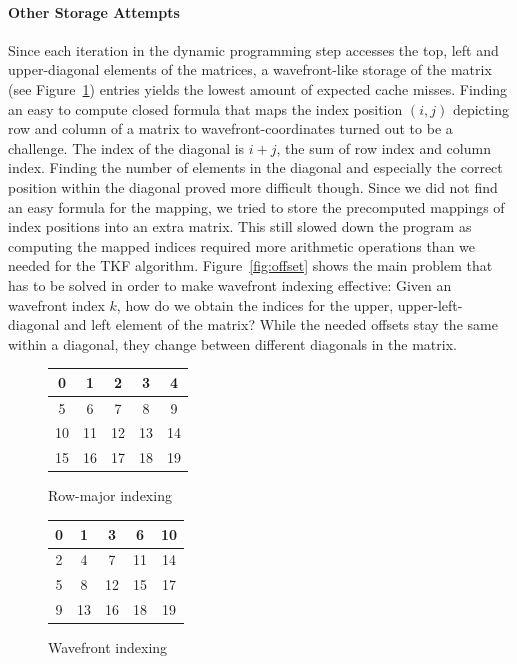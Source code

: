 \documentclass{article}
\begin{document}
\newpage

\paragraph{Other Storage Attempts}
\label{par:otherattempts}
Since each iteration in the dynamic programming step accesses the top, left and upper-diagonal elements of the matrices, a wavefront-like storage of the matrix (see Figure~\ref{fig:wavefront}) entries yields the lowest amount of expected cache misses. Finding an easy to compute closed formula that maps the index position $(i,j)$ depicting row and column of a matrix to wavefront-coordinates turned out to be a challenge. The index of the diagonal is $i+j$, the sum of row index and column index. Finding the number of elements in the diagonal and especially the correct position within the diagonal proved more difficult though.
Since we did not find an easy formula for the mapping, we tried to store the precomputed mappings of index positions into an extra matrix. This still slowed down the program as computing the mapped indices required more arithmetic operations than we needed for the TKF algorithm.
Figure~\ref{fig:offset} shows the main problem that has to be solved in order to make wavefront indexing effective: Given an wavefront index $k$, how do we obtain the indices for the upper, upper-left-diagonal and left element of the matrix? While the needed offsets stay the same within a diagonal, they change between different diagonals in the matrix.

\begin{figure}

\begin{minipage}{0.5\textwidth}
\centering
\begin{tabular}{|c|c|c|c|c|}
\hline 
0 & 1 & 2 & 3 & 4 \\ 
\hline 
5 & 6 & 7 & 8 & 9 \\ 
\hline 
10 & 11 & 12 & 13 & 14 \\ 
\hline 
15 & 16 & 17 & 18 & 19 \\ 
\hline
\end{tabular}
\caption{Row-major indexing}
\label{fig:rowmajor}
\end{minipage}
\begin{minipage}{0.5\textwidth}
\centering
\begin{tabular}{|c|c|c|c|c|}
\hline 
0 & 1 & 3 & 6 & 10 \\ 
\hline 
2 & 4 & 7 & 11 & 14 \\ 
\hline 
5 & 8 & 12 & 15 & 17 \\ 
\hline 
9 & 13 & 16 & 18 & 19 \\ 
\hline 
\end{tabular}
\caption{Wavefront indexing}
\label{fig:wavefront}
\end{minipage}
\end{figure}
\end{document}
